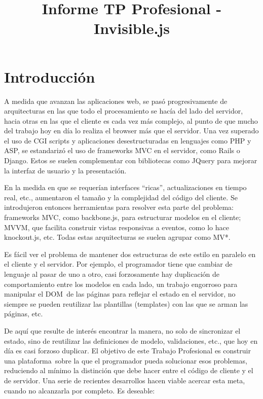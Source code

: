\documentclass[doc,helv,longtable]{article}
\begin{document}
\title{Informe TP Profesional - Invisible.js}
\maketitle

\section{Introducción}

A medida que avanzan las aplicaciones web, se pasó progresivamente de arquitecturas en las que todo el procesamiento se hacía del lado del servidor, hacia otras en las que el cliente es cada vez más complejo, al punto de que mucho del trabajo hoy en día lo realiza el browser más que el servidor\cite{jsmvcvs}. Una vez superado el uso de CGI scripts y aplicaciones desestructuradas en lenguajes como PHP y ASP, se estandarizó el uso de frameworks MVC en el servidor, como Rails o Django. Estos se suelen complementar con bibliotecas como JQuery para mejorar la interfaz de usuario y la presentación. 

En la medida en que se requerían interfaces “ricas”\cite{rich}, actualizaciones en tiempo real, etc., aumentaron el tamaño y la complejidad del código del cliente. Se introdujeron entonces herramientas para resolver esta parte del problema\cite{richjs}: frameworks MVC, como backbone.js\cite{backbone}, para estructurar modelos en el cliente; MVVM, que facilita construir vistas responsivas a eventos, como lo hace knockout.js\cite{knockout}, etc. Todas estas arquitecturas se suelen agrupar como MV*\cite{mvw}.

Es fácil ver el problema de mantener dos estructuras de este estilo en paralelo en el cliente y el servidor. Por ejemplo, el programador tiene que cambiar de lenguaje al pasar de uno a otro, casi forzosamente hay duplicación de comportamiento entre los modelos en cada lado, un trabajo engorroso para manipular el DOM de las páginas para reflejar el estado en el servidor, no siempre se pueden reutilizar las plantillas (templates) con las que se arman las páginas, etc.\cite{wdsucks}

De aquí que resulte de interés encontrar la manera, no solo de sincronizar el estado, sino de reutilizar las definiciones de modelo, validaciones, etc., que hoy en día es casi forzoso duplicar. El objetivo de este Trabajo Profesional es construir una plataforma sobre la que el programador pueda solucionar esos problemas, reduciendo al mínimo la distinción que debe hacer entre el código de cliente y el de servidor. Una serie de recientes desarrollos hacen viable acercar esta meta, cuando no alcanzarla por completo. Es deseable:
\end{document}
